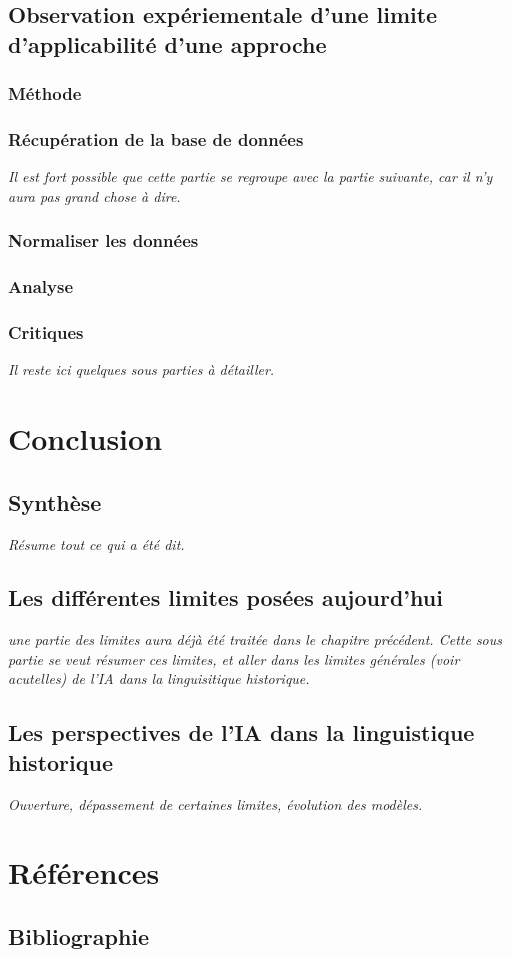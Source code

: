 \documentclass[12pt, french]{report}
\begin{document}
\section{Observation expériementale d'une limite d'applicabilité d'une approche}
\subsection{Méthode}
\subsection{Récupération de la base de données}
\textit{Il est fort possible que cette partie se regroupe avec la partie suivante, car il n'y aura pas grand chose à dire.}

\subsection{Normaliser les données}

\subsection{Analyse}
\subsection{Critiques}
\textit{Il reste ici quelques sous parties à détailler.}

\chapter{Conclusion}
\section{Synthèse}
\textit{Résume tout ce qui a été dit.}
\section{Les différentes limites posées aujourd'hui}
\textit{une partie des limites aura déjà été traitée dans le chapitre précédent. Cette sous partie se veut résumer ces limites, et aller dans les limites générales (voir acutelles) de l'IA dans  la linguisitique historique.}
\section{Les perspectives de l'IA dans la linguistique historique}
\textit{Ouverture, dépassement de certaines limites, évolution des modèles.}

\chapter{Références}
\section{Bibliographie}

\printbibliography
\end{document}
